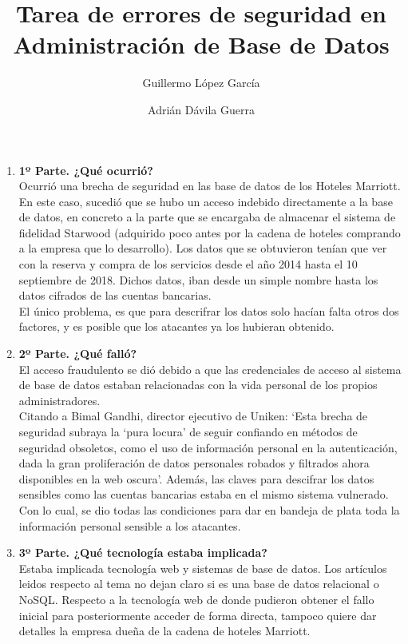 \documentclass{article}
\title{Tarea de errores de seguridad en Administración de Base de Datos}
\author{
Guillermo López García
\and
Adrián Dávila Guerra
}
\begin{document}
\maketitle

\begin{enumerate}[label=\alph*]
    \item \textbf{1º Parte. ¿Qué ocurrió?}\\
        Ocurrió una brecha de seguridad en las base de datos de los Hoteles Marriott.
    En este caso, sucedió que se hubo un acceso indebido directamente a la base
    de datos, en concreto a la parte que se encargaba de almacenar el
    sistema de fidelidad Starwood (adquirido poco antes por la cadena de hoteles
    comprando a la empresa que lo desarrollo). Los datos que se obtuvieron tenían
    que ver con la reserva y compra de los servicios desde el año 2014 hasta
    el 10 septiembre de 2018. Dichos datos, iban desde un simple nombre
    hasta los datos cifrados de las cuentas bancarias.\\
    El único problema, es que para descrifrar los datos solo hacían
    falta otros dos factores, y es posible que los atacantes ya los
    hubieran obtenido.
    
    \item \textbf{2º Parte. ¿Qué falló?}\\
        El acceso fraudulento se dió debido a que las credenciales de acceso
    al sistema de base de datos estaban relacionadas con la vida personal
    de los propios administradores.\\
    Citando a Bimal Gandhi, director ejecutivo de Uniken:
    `Esta brecha de seguridad subraya la `pura locura'
    de seguir confiando en métodos de seguridad obsoletos, como el uso de
    información personal en la autenticación, dada la gran proliferación
    de datos personales robados y filtrados ahora disponibles en la web
    oscura'. Además, las claves para descifrar los datos sensibles como
    las cuentas bancarias estaba en el mismo sistema vulnerado.\\
    Con lo cual, se dio todas las condiciones para dar en bandeja de plata
    toda la información personal sensible a los atacantes.
    
    \item \textbf{3º Parte. ¿Qué tecnología estaba implicada?}\\
        Estaba implicada tecnología web y sistemas de base de datos.
    Los artículos leidos respecto al tema no dejan claro si es
    una base de datos relacional o NoSQL\@. Respecto a la tecnología
    web de donde pudieron obtener el fallo inicial para posteriormente
    acceder de forma directa, tampoco quiere dar detalles la empresa
    dueña de la cadena de hoteles Marriott.
    

\end{enumerate}
\end{document}
